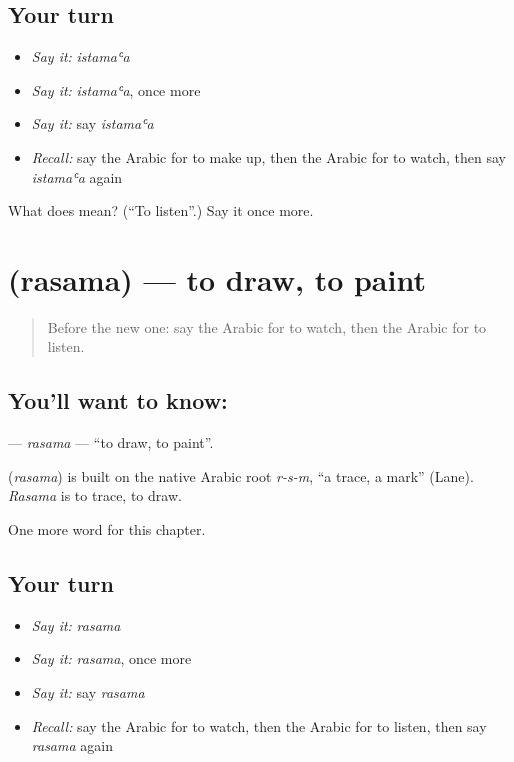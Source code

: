 \subsection*{Your turn}
\begin{itemize}
\raggedright
  \item \emph{Say it:} \emph{istamaʿa}
  \item \emph{Say it:} \emph{istamaʿa}, once more
  \item \emph{Say it:} say \emph{istamaʿa}
  \item \emph{Recall:} say the Arabic for to make up, then the Arabic for to watch, then say \emph{istamaʿa} again
\end{itemize}

\begin{tcolorbox}[breakable,colback=teal!4,colframe=teal!35!black,title={Before you move on}]
What does  mean? (\textquotedblleft{}To listen\textquotedblright{}.) Say it once more.
\end{tcolorbox}
\section[\texorpdfstring{\ar{رسم} (rasama)}{رسم (rasama)}]{ (rasama) — to draw, to paint}

\label{lesson:AR-C228-rasama}



\begin{quote}
Before the new one: say the Arabic for to watch, then the Arabic for to listen.
\end{quote}

\subsection*{You'll want to know: }
\textbf{} — \emph{rasama} — \textquotedblleft{}to draw, to paint\textquotedblright{}.

\begin{cousinweb}
\textbf{} (\emph{rasama}) is built on the native Arabic root \emph{r-s-m}, \textquotedblleft{}a trace, a mark\textquotedblright{} (Lane). \emph{Rasama} is to trace, to draw.
\end{cousinweb}

\begin{grammarlens}[title={What you've built}]
One more word for this chapter.
\end{grammarlens}

\subsection*{Your turn}
\begin{itemize}
\raggedright
  \item \emph{Say it:} \emph{rasama}
  \item \emph{Say it:} \emph{rasama}, once more
  \item \emph{Say it:} say \emph{rasama}
  \item \emph{Recall:} say the Arabic for to watch, then the Arabic for to listen, then say \emph{rasama} again
\end{itemize}

